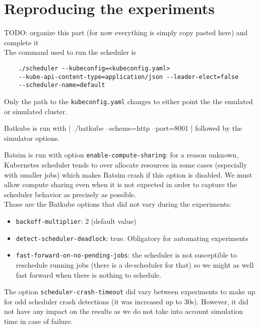 \section{Reproducing the experiments}

TODO: organize this part (for now everything is simply copy pasted here) and complete it\\

The command used to run the scheduler is
\begin{verbatim}
	./scheduler --kubeconfig=<kubeconfig.yaml>
	--kube-api-content-type=application/json --leader-elect=false
	--scheduler-name=default
\end{verbatim}
\noindent Only the path to the \texttt{kubeconfig.yaml} changes to either point the the
emulated or simulated cluster.

Batkube is run with | ./batkube --scheme=http --port=8001 |
\noindent followed by the simulator options.

Batsim is run with option \texttt{enable-compute-sharing}: for a reason
unknown, Kubernetes scheduler tends to over allocate resources in some cases
(especially with smaller jobs) which makes Batsim crash if this option is
disabled. We must allow compute sharing even when it is not expected in order
to capture the scheduler behavior as precisely as possible.\\

Those are the Batkube options that did not vary during the experiments:
\begin{itemize}
	\item \texttt{backoff-multiplier}: 2 (default value)
	\item \texttt{detect-scheduler-deadlock}: true. Obligatory for
		automating experiments
	\item \texttt{fast-forward-on-no-pending-jobs}: the scheduler is not
		susceptible to reschedule running jobs (there is a de-scheduler
		for that) so we might as well fast forward when there is
		nothing to schedule.

\end{itemize}

The option \texttt{scheduler-crash-timeout} did vary between experiments to
make up for odd scheduler crash detections (it was increased up to 30s).
However, it did not have any impact on the results as we do not take into
account simulation time in case of failure.

